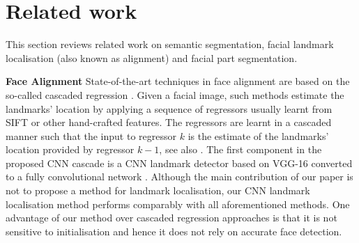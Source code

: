 \section{Related work}

This section reviews related work on semantic segmentation, facial
landmark localisation (also known as alignment) and facial part
segmentation.

\textbf{Face Alignment} State-of-the-art techniques in face alignment
are based on the so-called cascaded regression
\cite{dollar2010cascaded}. Given a facial image, such methods estimate
the landmarks' location by applying a sequence of regressors usually
learnt from SIFT \cite{lowe2004distinctive} or other hand-crafted
features. The regressors are learnt in a cascaded manner such that the
input to regressor $k$ is the estimate of the landmarks' location
provided by regressor $k-1$, see also
\cite{sanchez16,Cao2012shaperegression,xiongsupervised,zhu2015face,tzimiropoulos2015project}. The
first component in the proposed CNN cascade is a CNN landmark detector
based on VGG-16 \cite{simonyan2014very} converted to a fully
convolutional network \cite{long2015fully}. Although the main
contribution of our paper is not to propose a method for landmark
localisation, our CNN landmark localisation method performs comparably
with all aforementioned methods. One advantage of our method over
cascaded regression approaches is that it is not sensitive to
initialisation and hence it does not rely on accurate face detection.

